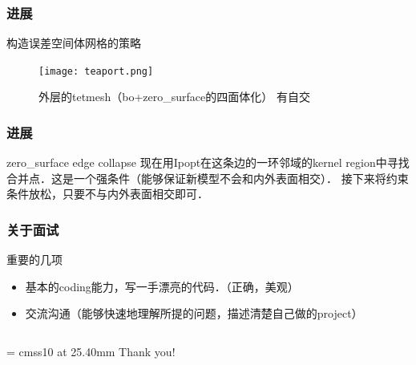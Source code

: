 \documentclass{beamer}
\begin{document}
\begin{frame}
  \frametitle{进展}
  \begin{block}{构造误差空间体网格的策略}
    \begin{figure}
      \texttt{[image: teaport.png]}
      \caption{外层的tetmesh（bo+zero\_surface的四面体化） 有自交}
    \end{figure}
  \end{block}
\end{frame}

\begin{frame}
  \frametitle{进展}
  \begin{block}{zero\_surface edge collapse}
    现在用Ipopt在这条边的一环邻域的kernel region中寻找合并点．这是一个强条件（能够保证新模型不会和内外表面相交）．
    接下来将约束条件放松，只要不与内外表面相交即可．
  \end{block}
\end{frame}

\begin{frame}
  \frametitle{关于面试}
  \begin{block}{重要的几项}
    \begin{itemize}
      \item 基本的coding能力，写一手漂亮的代码．（正确，美观）
      \item 交流沟通（能够快速地理解所提的问题，描述清楚自己做的project）
    \end{itemize}
  \end{block}
\end{frame}

\begin{frame}%

  \begin{columns}
    \begin{column}{\textwidth}
      \begin{center}
        \font\endfont = cmss10 at 25.40mm
        \endfont 
        \baselineskip 20.0mm
        Thank you!
      \end{center}    
    \end{column}
  \end{columns}
\end{frame}
\end{document}
